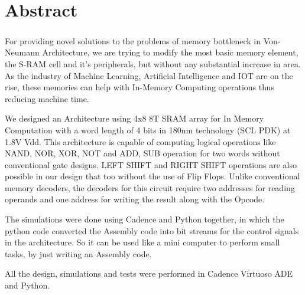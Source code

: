 %
%
%

\chapter*{Abstract}
\begin{OnehalfSpacing}
\paragraph{}
\end{OnehalfSpacing}

For providing novel solutions to the problems of memory bottleneck in Von-Neumann Architecture, we are trying to modify the most basic memory element, the S-RAM cell and it’s peripherals, but without any substantial increase in area. As the industry of Machine
Learning, Artificial Intelligence and IOT are on the rise, these memories can help with In-Memory Computing operations thus reducing machine time.

We designed an Architecture using 4x8 8T SRAM array for In Memory Computation with a word length of 4 bits in 180nm technology (SCL PDK) at 1.8V Vdd. This architecture is capable of computing logical operations like NAND, NOR, XOR, NOT and ADD, SUB operation for two words without conventional gate designs. LEFT SHIFT and RIGHT SHIFT operations are also possible in our design that too without the use of Flip Flops. Unlike conventional memory decoders, the decoders for this circuit require two addresses for reading operands and one address for writing the result along with the Opcode.  

The simulations were done using Cadence and Python together, in which the python code converted the Assembly code into bit streams for the control signals in the architecture. So it can be used like a mini computer to perform small tasks, by just writing an Assembly code.  

All the design, simulations and tests were performed in Cadence Virtuoso ADE and Python.

\clearpage 